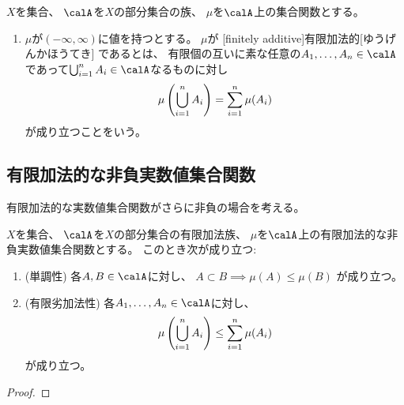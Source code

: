 \documentclass[report]{jlreq}
\begin{document}
\begin{definition}[有限加法性]
    $X$を集合、
    $\calA$を$X$の部分集合の族、
    $\mu$を$\calA$上の集合関数とする。
    \begin{enumerate}
        \item $\mu$が$(-\infty, \infty)$に値を持つとする。
            $\mu$が
            [finitely additive]{有限加法的}[ゆうげんかほうてき]
            であるとは、
            有限個の互いに素な任意の$A_1, \dots, A_n \in \calA$
            であって$\bigcup_{i = 1}^n A_i \in \calA$なるものに対し
            \begin{equation}
                \mu\left({\bigcup_{i = 1}^n A_i}\right) = \sum_{i = 1}^n \mu(A_i)
            \end{equation}
            が成り立つことをいう。
    \end{enumerate}
\end{definition}

\subsection{有限加法的な非負実数値集合関数}

有限加法的な実数値集合関数がさらに非負の場合を考える。

\begin{proposition}[有限加法的な非負実数値集合関数の基本性質]
    $X$を集合、
    $\calA$を$X$の部分集合の有限加法族、
    $\mu$を$\calA$上の有限加法的な非負実数値集合関数とする。
    このとき次が成り立つ:
    \begin{enumerate}
        \item (単調性) 各$A, B \in \calA$に対し、
            $A \subset B \implies \mu(A) \leq \mu(B)$
            が成り立つ。
        \item (有限劣加法性) 各$A_1, \dots, A_n \in \calA$に対し、
            \begin{equation}
                \mu\left({\bigcup_{i = 1}^n A_i}\right)
                    \le \sum_{i = 1}^n \mu(A_i)
            \end{equation}
            が成り立つ。
    \end{enumerate}
\end{proposition}

\begin{proof}
    \TODO{}
\end{proof}


%
\end{document}
